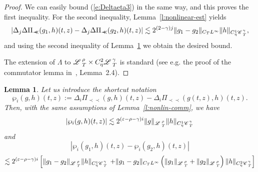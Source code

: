 \documentclass{amsart}
\newcommand{\assign}{:=}
\newcommand{\precprec}{\prec\!\!\!\prec}
\newtheorem{lemma}[theorem]{Lemma}
\theoremstyle{remark}
\theoremstyle{definition}
\newcommand{\CC}{\mathscr{C} \hspace{.1em}}
\newcommand{\LL}{\mathscr{L} \hspace{.2em}}
\begin{document}
\begin{proof}
  We can easily bound (\ref{e:Deltaeta3}) in the same way, and this proves the
  first inequality. For the second inequality, Lemma~\ref{l:nonlinear-est}
  yields
  \[ | \Delta_j \Delta \Pi_{\precprec} (g_1, h) (t, z) - \Delta_j \Delta
     \Pi_{\precprec} (g_2, h) (t, z) | \lesssim 2^{(2 - \gamma) j} \| g_1 -
     g_2 \|_{C_T L^{\infty}} \| h \|_{C^1_{\eta} \CC^{\gamma}_T}, \]
  and using the second inequality of Lemma~\ref{l:para-increment} we obtain
  the desired bound.
  
  The extension of $\Lambda$ to $\LL^{\rho}_T \times C_{\eta}^2
  \LL_T^{\gamma}$ is standard (see e.g. the proof of the commutator lemma
  in~{\cite{gubinelli_paracontrolled_2015}}, Lemma~2.4). 
\end{proof}

\begin{lemma}
  \label{l:para-increment}Let us introduce the shortcut notation
  \[ \wp_i (g, h) (t, z) \assign \Delta_i \Pi_{\precprec} (g, h) (t, z) -
     \Delta_i \Pi_{\precprec} (g (t, z), h) (t, z) . \]
  Then, with the same assumptions of Lemma~\ref{l:nonlin-comm}, we have
  \[ | \wp_i (g, h) (t, z) | \lesssim 2^{(\varepsilon - \rho - \gamma) i} \| g
     \|_{\LL^{\rho}_T} \| h \|_{C_{\eta}^1 \CC^{\gamma}_{_T}} \]
  and
  \[ | \wp_i (g_1, h) (t, z) - \wp_i (g_2, h) (t, z) | \]
  \[ \lesssim 2^{(\varepsilon - \rho - \gamma) i} \left[ \| g_1 - g_2
     \|_{\LL^{\rho}_T} \| h \|_{C_{\eta}^1 \CC^{\gamma}_T} \right. \left. + \|
     g_1 - g_2 \|_{C_T L^{\infty}} \left( \| g_1 \|_{\LL^{\rho}_T} + \| g_2
     \|_{\LL^{\rho}_T} \right) \| h \|_{C_{\eta}^2 \CC^{\gamma}_T} \right] \]
\end{lemma}
\end{document}
